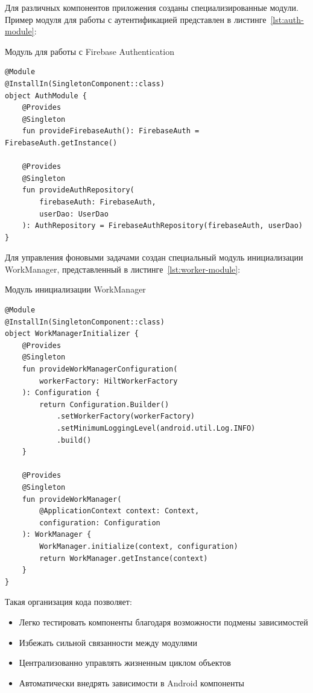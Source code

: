 \documentclass[14pt, russian]{scrartcl}
\begin{document}
Для различных компонентов приложения созданы специализированные модули. Пример модуля для работы с аутентификацией представлен в листинге~\ref{lst:auth-module}:

\begin{listing}[!htb]
\caption{Модуль для работы с Firebase Authentication}
\vspace{-0.3cm}
\label{lst:auth-module}
\begin{verbatim}
@Module
@InstallIn(SingletonComponent::class)
object AuthModule {
    @Provides
    @Singleton
    fun provideFirebaseAuth(): FirebaseAuth = FirebaseAuth.getInstance()

    @Provides
    @Singleton
    fun provideAuthRepository(
        firebaseAuth: FirebaseAuth,
        userDao: UserDao
    ): AuthRepository = FirebaseAuthRepository(firebaseAuth, userDao)
}
\end{verbatim}
\end{listing}

Для управления фоновыми задачами создан специальный модуль инициализации WorkManager, представленный в листинге~\ref{lst:worker-module}:

\begin{listing}[!htb]
\caption{Модуль инициализации WorkManager}
\vspace{-0.3cm}
\label{lst:worker-module}
\begin{verbatim}
@Module
@InstallIn(SingletonComponent::class)
object WorkManagerInitializer {
    @Provides
    @Singleton
    fun provideWorkManagerConfiguration(
        workerFactory: HiltWorkerFactory
    ): Configuration {
        return Configuration.Builder()
            .setWorkerFactory(workerFactory)
            .setMinimumLoggingLevel(android.util.Log.INFO)
            .build()
    }

    @Provides
    @Singleton
    fun provideWorkManager(
        @ApplicationContext context: Context,
        configuration: Configuration
    ): WorkManager {
        WorkManager.initialize(context, configuration)
        return WorkManager.getInstance(context)
    }
}
\end{verbatim}
\end{listing}

Такая организация кода позволяет:
\begin{itemize}
\item Легко тестировать компоненты благодаря возможности подмены зависимостей
\item Избежать сильной связанности между модулями
\item Централизованно управлять жизненным циклом объектов
\item Автоматически внедрять зависимости в Android компоненты
\end{itemize}
\end{document}
